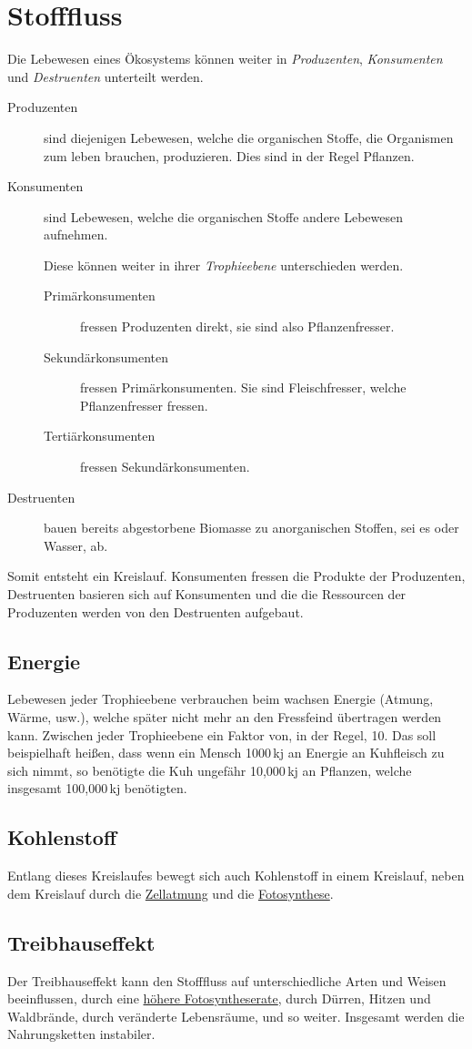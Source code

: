 \documentclass{article}
\begin{document}
\section{Stofffluss}
Die Lebewesen eines Ökosystems können weiter in \emph{Produzenten}, \emph{Konsumenten} und \emph{Destruenten} unterteilt werden.
\begin{description} 
 \item[Produzenten] sind diejenigen Lebewesen, welche die organischen Stoffe, die Organismen zum leben brauchen, produzieren. Dies sind in der Regel Pflanzen. 
 \item[Konsumenten] sind Lebewesen, welche die organischen Stoffe andere Lebewesen aufnehmen.
 
Diese können weiter in ihrer \emph{Trophieebene} unterschieden werden.
 \begin{description}
  \item[Primärkonsumenten] fressen Produzenten direkt, sie sind also Pflanzenfresser.
  \item[Sekundärkonsumenten] fressen Primärkonsumenten. Sie sind Fleischfresser, welche Pflanzenfresser fressen.
  \item[Tertiärkonsumenten] fressen Sekundärkonsumenten. 
 \end{description} 
 \item[Destruenten] bauen bereits abgestorbene Biomasse zu anorganischen Stoffen, sei es  oder Wasser, ab.
\end{description}
Somit entsteht ein Kreislauf. Konsumenten fressen die Produkte der Produzenten, Destruenten basieren sich auf Konsumenten und die die Ressourcen der Produzenten werden von den Destruenten aufgebaut.
 
\subsection{Energie}
Lebewesen jeder Trophieebene verbrauchen beim wachsen Energie (Atmung, Wärme, usw.), welche später nicht mehr an den Fressfeind übertragen werden kann. Zwischen jeder Trophieebene ein Faktor von, in der Regel, 10. Das soll beispielhaft heißen, dass wenn ein Mensch 1000\,kj an Energie an Kuhfleisch zu sich nimmt, so benötigte die Kuh ungefähr 10,000\,kj an Pflanzen, welche insgesamt 100,000\,kj benötigten.

\subsection{Kohlenstoff}
Entlang dieses Kreislaufes bewegt sich auch Kohlenstoff in einem Kreislauf, neben dem Kreislauf durch die \hyperref[Zellatmung]{Zellatmung} und die \hyperref[Fotosynthese]{Fotosynthese}.

\subsection{Treibhauseffekt}
Der Treibhauseffekt kann den Stofffluss auf unterschiedliche Arten und Weisen beeinflussen, durch eine \hyperref[Äußere Einflussfaktoren]{höhere Fotosyntheserate}, durch Dürren, Hitzen und Waldbrände, durch veränderte Lebensräume, und so weiter. Insgesamt werden die Nahrungsketten instabiler.
\end{document}
